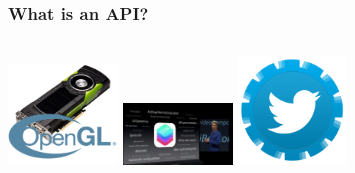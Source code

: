 \documentclass{beamer}
\begin{document}
\begin{frame}
  \frametitle{What is an API?}
  \begin{columns}
    \includegraphics[width=110]{img/opengl.png}
    \pause
    \includegraphics[width=110]{img/ios.jpg}
    \pause
    \includegraphics[width=110]{img/twitter.png}
  \end{columns}
\end{frame}
\end{document}
